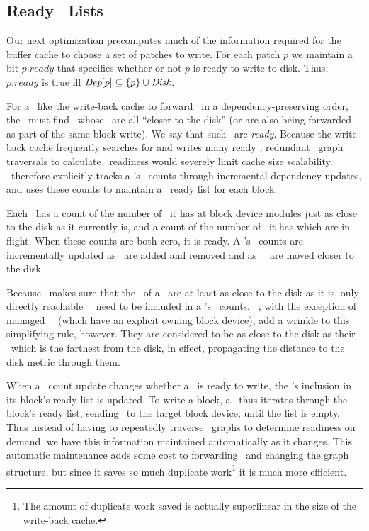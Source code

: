 
\subsection{Ready \ChDesc\ Lists}
\label{sec:patch:readylist}

\newcommand{\PReady}[1]{\ensuremath{#1.\textit{ready}}}

Our next optimization precomputes much of the information required for the
buffer cache to choose a set of patches to write.
%
For each patch $p$ we maintain a bit $\PReady{p}$ that specifies whether or
not $p$ is ready to write to disk.
%
Thus, $\PReady{p}$ is true iff $\PDepset{p} \subseteq \{p\} \cup \PDisk$.
%



For a \module\ like the write-back cache to forward \chdescs\ in a
dependency-preserving order, the \module\ must find \chdescs\ whose \befores\
are all ``closer to the disk'' (or are also being forwarded as part of the same
block write). We say that such \chdescs\ are \emph{ready}. Because the
write-back cache frequently searches for and writes many ready \chdescs,
redundant \chdesc\ graph traversals to calculate \chdesc\ readiness would
severely limit cache size scalability. \Kudos\ therefore explicitly tracks a
\chdesc's \before\ counts through incremental dependency updates, and uses these
counts to maintain a \chdesc\ ready list for each block.

Each \chdesc\ has a count of the number of \befores\ it has at block device
modules just as close to the disk as it currently is, and a count of the number
of \befores\ it has which are in flight. When these counts are both zero, it is
ready. A \chdesc's \before\ counts are incrementally updated as \befores\ are
added and removed and as \beforing\ \chdescs\ are moved closer to the disk.

Because \Kudos\ makes sure that the \befores\ of a \chdesc\ are at least as
close to the disk as it is, only directly reachable \beforing\ \chdescs\ need to
be included in a \chdesc's \before\ counts. \Noop\ \chdescs, with the exception
of managed \noop\ \chdescs\ (which have an explicit owning block device), add a
wrinkle to this simplifying rule, however. They are considered to be as close to
the disk as their \before\ which is the farthest from the disk, in effect,
propagating the distance to the disk metric through them.

When a \before\ count update changes whether a \chdesc\ is ready to write, the
\chdesc's inclusion in its block's ready list is updated. To write a block, a
\module\ thus iterates through the block's ready list, sending \chdescs\ to the
target block device, until the list is empty. Thus instead of having to
repeatedly traverse \chdesc\ graphs to determine readiness on demand, we have
this information maintained automatically as it changes. This automatic
maintenance adds some cost to forwarding \chdescs\ and changing the graph
structure, but since it saves so much duplicate work\footnote{The amount of
duplicate work saved is actually superlinear in the size of the write-back
cache.} it is much more efficient.
